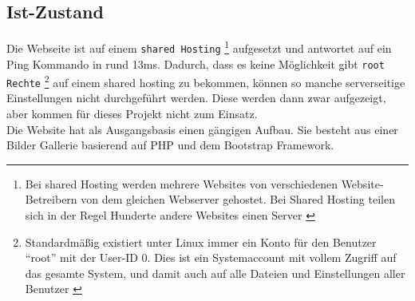
	\subsection{Ist-Zustand} %
	\label{sub:ist_zustand}
		Die Webseite ist auf einem \texttt{shared Hosting}
		\footnote{Bei shared Hosting werden mehrere Websites von verschiedenen Website-Betreibern von dem gleichen Webserver gehostet. Bei Shared Hosting teilen sich in der Regel Hunderte andere Websites einen Server \autocite{itWissen}} 
		aufgesetzt und antwortet auf ein Ping Kommando in rund 13ms. Dadurch, dass es keine Möglichkeit gibt \texttt{root Rechte} \footnote{Standardmäßig existiert unter Linux immer ein Konto für den Benutzer "`root"' mit der User-ID 0. Dies ist ein Systemaccount mit vollem Zugriff auf das gesamte System, und damit auch auf alle Dateien und Einstellungen aller Benutzer \autocite{ubuntu14}} auf einem shared hosting zu bekommen, können so manche serverseitige Einstellungen nicht durchgeführt werden. Diese werden dann zwar aufgezeigt, aber kommen für dieses Projekt nicht zum Einsatz.\\
		Die Website hat als Ausgangsbasis einen gängigen Aufbau. Sie besteht aus einer Bilder Gallerie basierend auf PHP und dem Bootstrap Framework.

		
\pagebreak
%
%
